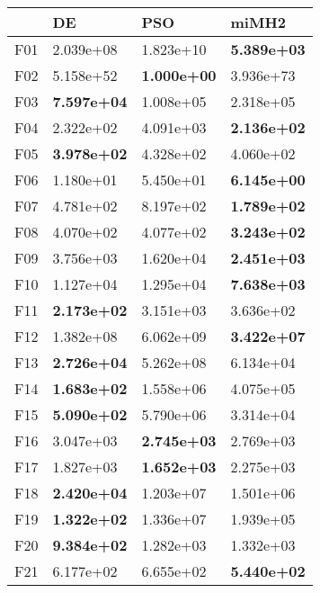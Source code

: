 \documentclass[10pt,a4paper]{article}
\begin{document}
\begin{table}[]
	\centering
	\begin{tabular}{|l|l|l|l|}
		\hline
		& DE                 & PSO                & miMH2              \\ \hline
		F01  & 2.039e+08          & 1.823e+10          & \textbf{5.389e+03} \\
		F02  & 5.158e+52          & \textbf{1.000e+00} & 3.936e+73          \\
		F03  & \textbf{7.597e+04} & 1.008e+05          & 2.318e+05          \\
		F04  & 2.322e+02          & 4.091e+03          & \textbf{2.136e+02} \\
		F05  & \textbf{3.978e+02} & 4.328e+02          & 4.060e+02          \\
		F06  & 1.180e+01          & 5.450e+01          & \textbf{6.145e+00} \\
		F07  & 4.781e+02          & 8.197e+02          & \textbf{1.789e+02} \\
		F08  & 4.070e+02          & 4.077e+02          & \textbf{3.243e+02} \\
		F09  & 3.756e+03          & 1.620e+04          & \textbf{2.451e+03} \\
		F10  & 1.127e+04          & 1.295e+04          & \textbf{7.638e+03} \\
		F11  & \textbf{2.173e+02} & 3.151e+03          & 3.636e+02          \\
		F12  & 1.382e+08          & 6.062e+09          & \textbf{3.422e+07} \\
		F13  & \textbf{2.726e+04} & 5.262e+08          & 6.134e+04          \\
		F14  & \textbf{1.683e+02} & 1.558e+06          & 4.075e+05          \\
		F15  & \textbf{5.090e+02} & 5.790e+06          & 3.314e+04          \\
		F16  & 3.047e+03          & \textbf{2.745e+03} & 2.769e+03          \\
		F17  & 1.827e+03          & \textbf{1.652e+03} & 2.275e+03          \\
		F18  & \textbf{2.420e+04} & 1.203e+07          & 1.501e+06          \\
		F19  & \textbf{1.322e+02} & 1.336e+07          & 1.939e+05          \\
		F20  & \textbf{9.384e+02} & 1.282e+03          & 1.332e+03          \\
		F21  & 6.177e+02          & 6.655e+02          & \textbf{5.440e+02} \\

\end{tabular}
\end{table}
\end{document}
